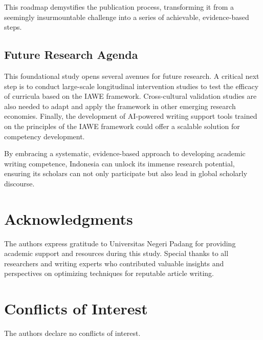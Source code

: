 \documentclass[journal,article,submit,pdftex,moreauthors]{Definitions/mdpi}
\begin{document}
This roadmap demystifies the publication process, transforming it from a seemingly insurmountable challenge into a series of achievable, evidence-based steps.

\subsection{Future Research Agenda}

This foundational study opens several avenues for future research. A critical next step is to conduct large-scale longitudinal intervention studies to test the efficacy of curricula based on the IAWE framework. Cross-cultural validation studies are also needed to adapt and apply the framework in other emerging research economies. Finally, the development of AI-powered writing support tools trained on the principles of the IAWE framework could offer a scalable solution for competency development.

By embracing a systematic, evidence-based approach to developing academic writing competence, Indonesia can unlock its immense research potential, ensuring its scholars can not only participate but also lead in global scholarly discourse.

\section*{Acknowledgments}

The authors express gratitude to Universitas Negeri Padang for providing academic support and resources during this study. Special thanks to all researchers and writing experts who contributed valuable insights and perspectives on optimizing techniques for reputable article writing.

\section*{Conflicts of Interest}

The authors declare no conflicts of interest.


\end{document}

